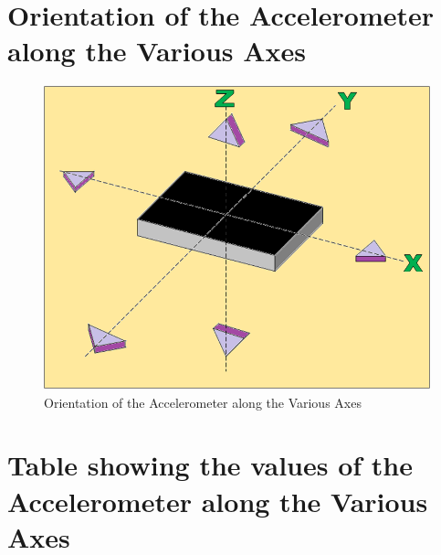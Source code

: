 \documentclass[a4paper,12 pt]{article}
\begin{document}
\section{Orientation of the Accelerometer along the Various Axes}
\vspace {5 mm}
\begin{figure}[h]
\begin{center}
\includegraphics[]{acc3.png}
\caption{Orientation of the Accelerometer along the Various Axes}
\label{fig:4}
\end{center}
\end{figure}
\pagebreak
\section{Table showing the values of the Accelerometer along the Various Axes}
\end{document}
